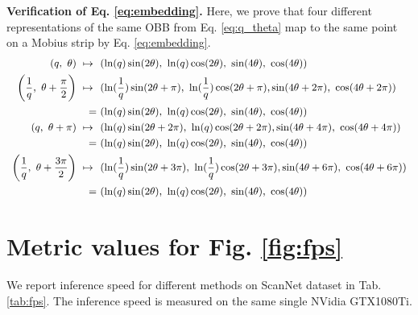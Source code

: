 \documentclass[runningheads]{llncs}
\begin{document}
\textbf{Verification of Eq. \ref{eq:embedding}.}
Here, we prove that four different representations of the same OBB from Eq. \ref{eq:q_theta} map to the same point on a Mobius strip by Eq. \ref{eq:embedding}.
\begin{equation*}\small\begin{aligned}
    (q,\ \theta)\ \mapsto\ & \ (\ln(q) \sin(2\theta),\ \ln(q) \cos(2\theta),\ \sin(4\theta),\ \cos(4\theta)) \\
    \left( \frac{1}{q},\ \theta+\frac{\pi}{2} \right) \ \mapsto\ & \ ( \ln ( \frac{1}{q} ) \sin(2\theta + \pi),\  \ln ( \frac{1}{q} ) \cos(2\theta + \pi), \sin(4\theta + 2\pi),\ \cos(4\theta + 2\pi ) \large ) \\
    = & \ (\ln(q) \sin(2\theta),\ \ln(q) \cos(2\theta),\ \sin(4\theta),\ \cos(4\theta)) \\
    (q,\ \theta+\pi)\ \mapsto\ & \ (\ln(q) \sin(2\theta + 2\pi),\ \ln(q) \cos(2\theta + 2\pi), \sin(4\theta + 4\pi),\ \cos(4\theta + 4\pi)) \\
    = & \ (\ln(q) \sin(2\theta),\ \ln(q) \cos(2\theta),\ \sin(4\theta),\ \cos(4\theta)) \\
    \left( \frac{1}{q},\ \theta+\frac{3\pi}{2} \right) \ \mapsto\ & \ ( \ln ( \frac{1}{q} ) \sin(2\theta + 3\pi),\  \ln (\frac{1}{q} ) \cos(2\theta + 3\pi), \sin(4\theta + 6\pi),\ \cos(4\theta + 6\pi) ) \\
    = & \ (\ln(q) \sin(2\theta),\ \ln(q) \cos(2\theta),\ \sin(4\theta),\ \cos(4\theta)) \\
\end{aligned}\end{equation*}

\section{Metric values for Fig. \ref{fig:fps}}

We report inference speed for different methods on ScanNet dataset in Tab. \ref{tab:fps}. The inference speed is measured on the same single NVidia GTX1080Ti.
\end{document}
